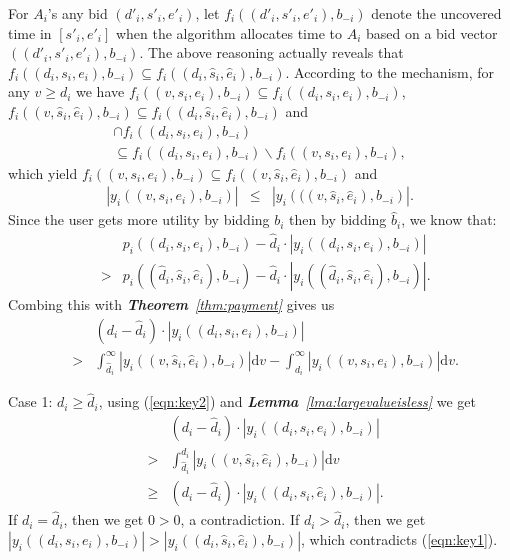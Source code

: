 \documentclass[10pt,journal,compsoc]{IEEEtran}
\begin{document}
\begin{IEEEproof}
    For $A_i$'s any bid $(d'_i,s'_i,e'_i)$, let $f_i((d'_i,s'_i,e'_i),b_{-i})$ denote the uncovered time in $[s'_i,e'_i]$ when the algorithm allocates time to $A_i$ based on a bid vector $((d'_i,s'_i,e'_i),b_{-i})$. The above reasoning actually reveals that $f_i((d_i,s_i,e_i),b_{-i})\subseteq f_i((d_i,\hat{s}_i,\hat{e}_i),b_{-i})$. According to the mechanism, for any $v\geq d_i$ we have $f_i((v,s_i,e_i),b_{-i})\subseteq f_i((d_i,s_i,e_i),b_{-i})$, $f_i((v,\hat{s}_i,\hat{e}_i),b_{-i})\subseteq f_i((d_i,\hat{s}_i,\hat{e}_i),b_{-i})$ and
\begin{eqnarray}
        [f_i((d_i,\hat{s}_i,\hat{e}_i),b_{-i})\backslash f_i((v,\hat{s}_i,\hat{e}_i),b_{-i})]\cap f_i((d_i,s_i,{e}_i),b_{-i})\nonumber\\
        \subseteq f_i((d_i,{s}_i,{e}_i),b_{-i})\backslash f_i((v,{s}_i,{e}_i),b_{-i}), \nonumber
    \end{eqnarray}
which yield $f_i((v,s_i,e_i),b_{-i})\subseteq f_i((v,\hat{s}_i,\hat{e}_i),b_{-i})$ and
\begin{eqnarray}
      |y_i\left((v,s_i,e_i),b_{-i}\right)| &\leq& |y_i\left(((v,\hat{s}_i,\hat{e}_i),b_{-i}\right)|.
      \label{eqn:key2}
    \end{eqnarray}
Since the user gets more utility by bidding $b_i$ then by bidding $\hat{b}_i$, we know that:
\begin{eqnarray}
      &&p_i((d_i,s_i,e_i),b_{-i})- \hat{d}_i\cdot |y_i((d_i,s_i,e_i),b_{-i})|\nonumber\\
      &>& p_i((\hat{d}_i,\hat{s}_i,\hat{e}_i),b_{-i})- \hat{d}_i\cdot |y_i((\hat{d}_i,\hat{s}_i,\hat{e}_i),b_{-i})|. \nonumber
    \end{eqnarray}
Combing this with \textit{\textbf{Theorem}~\ref{thm:payment}} gives us
\begin{eqnarray}
      &&(d_i- \hat{d}_i)\cdot |y_i((d_i,s_i,e_i),b_{-i})| \nonumber\\
      &>& \int_{\hat{d}_i}^\infty |y_i((v,\hat{s}_i,\hat{e}_i),b_{-i})|\mathrm{d}v-\int_{d_i}^\infty |y_i((v,s_i,e_i),b_{-i})|\mathrm{d}v. \nonumber
    \end{eqnarray}

    Case 1: $d_i\geq \hat{d}_i$, using (\ref{eqn:key2}) and \textit{\textbf{Lemma}~\ref{lma:largevalueisless}} we get
\begin{eqnarray}
      &&(d_i- \hat{d}_i)\cdot |y_i((d_i,s_i,e_i),b_{-i})| \nonumber \\
      &>& \int_{\hat{d}_i}^{d_i} |y_i((v,\hat{s}_i,\hat{e}_i),b_{-i})|\mathrm{d}v \nonumber\\
      &\geq& (d_i- \hat{d}_i)\cdot |y_i((d_i,\hat{s}_i,\hat{e}_i),b_{-i})|. \nonumber
    \end{eqnarray}
If $d_i=\hat{d}_i$, then we get $0>0$, a contradiction. If $d_i>\hat{d}_i$, then we get $|y_i((d_i,s_i,e_i),b_{-i})|>|y_i((d_i,\hat{s}_i,\hat{e}_i),b_{-i})|$, which contradicts (\ref{eqn:key1}).


\end{IEEEproof}
\end{document}
